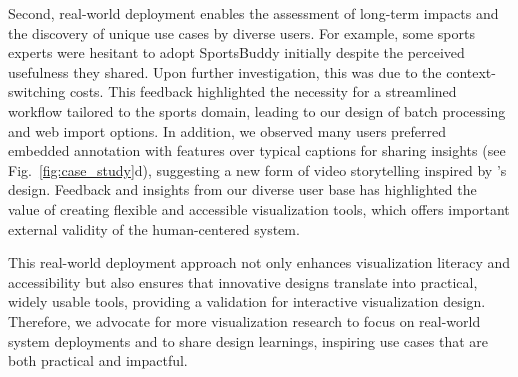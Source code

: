Second, real-world deployment enables the assessment of long-term impacts and the discovery of unique use cases by diverse users. 
For example, some sports experts were hesitant to adopt SportsBuddy initially despite the perceived usefulness they shared. Upon further investigation, this was due to the context-switching costs. This feedback highlighted the necessity for a streamlined workflow tailored to the sports domain, leading to our design of batch processing and web import options. In addition, we observed many users preferred embedded annotation with \Text{} features over typical captions for sharing insights (see Fig.~\ref{fig:case_study}d), suggesting a new form of video storytelling inspired by \SB{}’s design. 
Feedback and insights from our diverse user base has highlighted the value of creating flexible and accessible visualization tools, which offers important external validity of the human-centered system.

This real-world deployment approach not only enhances visualization literacy and accessibility but also ensures that innovative designs translate into practical, widely usable tools, providing a validation for interactive visualization design. Therefore, we advocate for more visualization research to focus on real-world system deployments and to share design learnings, inspiring use cases that are both practical and impactful.


